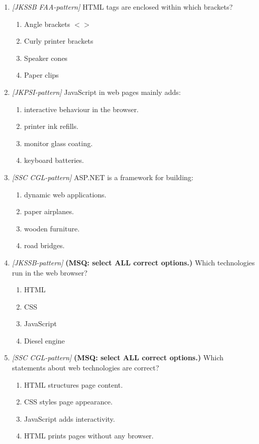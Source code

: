 \documentclass[11pt]{article}
\begin{document}
\begin{enumerate}[label=\textbf{Q\arabic*.}, leftmargin=*]
\item \textit{[JKSSB FAA-pattern]} HTML tags are enclosed within which brackets?
  \begin{enumerate}[label=\Alph*.]
    \item Angle brackets $< >$
    \item Curly printer brackets
    \item Speaker cones
    \item Paper clips
  \end{enumerate}
\item \textit{[JKPSI-pattern]} JavaScript in web pages mainly adds:
  \begin{enumerate}[label=\Alph*.]
    \item interactive behaviour in the browser.
    \item printer ink refills.
    \item monitor glass coating.
    \item keyboard batteries.
  \end{enumerate}
\item \textit{[SSC CGL-pattern]} ASP.NET is a framework for building:
  \begin{enumerate}[label=\Alph*.]
    \item dynamic web applications.
    \item paper airplanes.
    \item wooden furniture.
    \item road bridges.
  \end{enumerate}
\item \textit{[JKSSB-pattern]} \textbf{(MSQ: select ALL correct options.)} Which technologies run in the web browser?
  \begin{enumerate}[label=\Alph*.]
    \item HTML
    \item CSS
    \item JavaScript
    \item Diesel engine
  \end{enumerate}
\item \textit{[SSC CGL-pattern]} \textbf{(MSQ: select ALL correct options.)} Which statements about web technologies are correct?
  \begin{enumerate}[label=\Alph*.]
    \item HTML structures page content.
    \item CSS styles page appearance.
    \item JavaScript adds interactivity.
    \item HTML prints pages without any browser.
  \end{enumerate}
\end{enumerate}
\def\JKSSBLessonID{63}\def\JKSSBAnswers{0}
\end{document}
